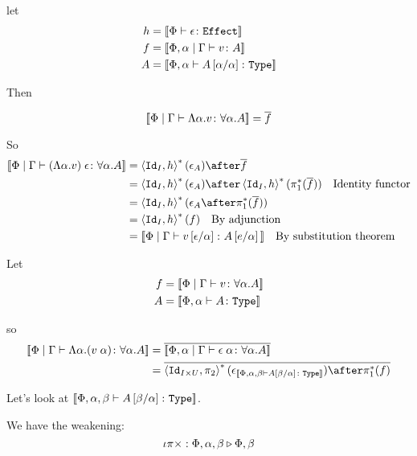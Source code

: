 {    
    let 
    \begin{align}
        h & = {\bf [\![}\Phi \vdash \epsilon \colon \texttt{Effect}{\bf ]\!]}
        \\
        f & = {\bf [\![}\Phi,\alpha\mid\Gamma \vdash v \colon A{\bf ]\!]}
        \\
        A &= {\bf [\![}\Phi,\alpha \vdash A\left[\alpha / \alpha\right] \colon \texttt{Type}{\bf ]\!]}
    \end{align}

    Then

    \begin{equation}
        {\bf [\![}\Phi\mid\Gamma \vdash \Lambda \alpha. v \colon \forall \alpha. A{\bf ]\!]} = \overline{f}\\
    \end{equation}

    So
    \begin{align}
        \deno{\gpetyperelation{\eapp{(\elam{\a}{v})}{\e}}{\all{\a}{A}}} & = \pr{\Id{I}}{h}\star(\e_A)\after\bar{f}\\
        & = \pr{\Id{I}}{h}\star(\e_A)\after\pr{\Id{I}}{h}\star(\pstar(\bar{f}))\qt{Identity functor}\\
        &= \pr{\Id{I}}{h}\star(\e_A\after\pstar(\bar{f}))\\
        &= \pr{\Id{I}}{h}\star(f)\qt{By adjunction}\\
        &= \deno{\gpetyperelation{v\ssub{\a}{\e}}{A\ssub{\a}{e}}}\qt{By substitution theorem}\\
    \end{align}

    Let \begin{align}
        f & = {\bf [\![}\Phi\mid\Gamma \vdash v \colon \forall \alpha. A{\bf ]\!]}\\
        A & = {\bf [\![}\Phi,\alpha \vdash A \colon \texttt{Type}{\bf ]\!]}
    \end{align}

    so
    \begin{align}
        \deno{\gpetyperelation{\elam{\a}{(\eapp{v}{\a})}}{\all{\a}{A}}} & = \bar{\deno{\etyperelation{\P,\a}{\G}{\eapp{\e}{\a}}{\all{\a}{A}}}} \\
        & = \bar{\pr{\Id{I\times U}}{\pp}\star(\e_{\deno{\typerelation{\P,\a,\b}{A\ssub{\a}{\b}}{\type}}})\after\pstar(f)}
    \end{align}

    Let's look at ${\bf [\![}\Phi,\alpha,\beta \vdash A\left[\beta / \alpha\right] \colon \texttt{Type}{\bf ]\!]}$.

    We have the weakening:
    \begin{equation}
        \iota\pi\times : \Phi,\alpha,\beta \triangleright \Phi,\beta
    \end{equation}

}
